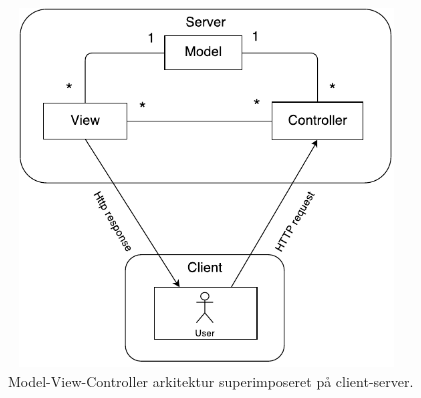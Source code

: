 \documentclass[12pt]{article}   %
\begin{document}
\begin{figure}[!ht]
	\centering
\includegraphics[width=10.5cm, height=9.5cm]{mvc.pdf}
\caption{Model-View-Controller arkitektur superimposeret på client-server.}
\label{fig:mvc}
\end{figure}
\end{document}
